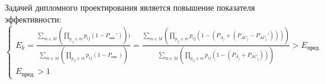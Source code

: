 
\vspace{\baselineskip}
Задачей дипломного проектирования является повышение показателя эффективности:
$$
\begin{cases}
   E_k=\frac{\sum_{m \in M} (\prod_{p_{ij} \in m} p_{ij}(1-P_{\textrm{ош.}}')))}{\sum_{m \in M} (\prod_{p_{ij} \in m} p_{ij}(1-P_{\textrm{ош.}}))} = \frac{\sum_{m \in M} (\prod_{p_{ij} \in m} p_{ij}(1-(P_{A_j}+(P_{{AC}_j}-P_{{AC}_j}'))))}{\sum_{m \in M} (\prod_{p_{ij} \in m} p_{ij}(1-(P_{A_j}+P_{{AC}_j})))} > E_{\textrm{пред.}} \\
   E_{\textrm{пред.}} > 1
  \end{cases}
$$
